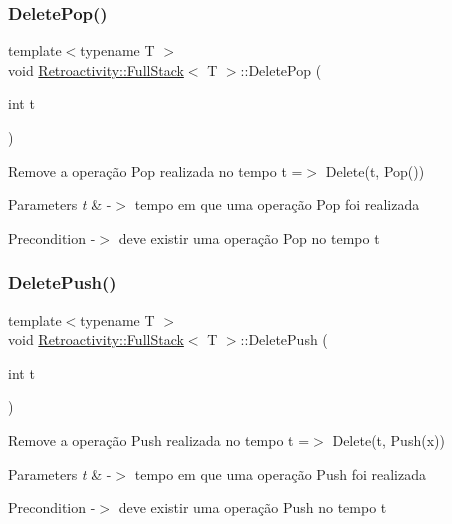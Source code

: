 \subsubsection{\texorpdfstring{Delete\+Pop()}{DeletePop()}}
{\footnotesize\ttfamily template$<$typename T $>$ \\
void \hyperlink{classRetroactivity_1_1FullStack}{Retroactivity\+::\+Full\+Stack}$<$ T $>$\+::Delete\+Pop (\begin{DoxyParamCaption}\item[{int}]{t }\end{DoxyParamCaption})}

Remove a operação Pop realizada no tempo t =$>$ Delete(t, Pop())


\begin{DoxyParams}{Parameters}
{\em t} & -\/$>$ tempo em que uma operação Pop foi realizada \\
\hline
\end{DoxyParams}
\begin{DoxyPrecond}{Precondition}
-\/$>$ deve existir uma operação Pop no tempo t 
\end{DoxyPrecond}
\mbox{\label{classRetroactivity_1_1FullStack_ae3817cbeed3650f16f86fc1bccc73a0d}} 
\subsubsection{\texorpdfstring{Delete\+Push()}{DeletePush()}}
{\footnotesize\ttfamily template$<$typename T $>$ \\
void \hyperlink{classRetroactivity_1_1FullStack}{Retroactivity\+::\+Full\+Stack}$<$ T $>$\+::Delete\+Push (\begin{DoxyParamCaption}\item[{int}]{t }\end{DoxyParamCaption})}

Remove a operação Push realizada no tempo t =$>$ Delete(t, Push(x))


\begin{DoxyParams}{Parameters}
{\em t} & -\/$>$ tempo em que uma operação Push foi realizada \\
\hline
\end{DoxyParams}
\begin{DoxyPrecond}{Precondition}
-\/$>$ deve existir uma operação Push no tempo t 
\end{DoxyPrecond}
\mbox{\label{classRetroactivity_1_1FullStack_aaaeedeaad4afd857bc2e28af1b2ad5c6}} 
